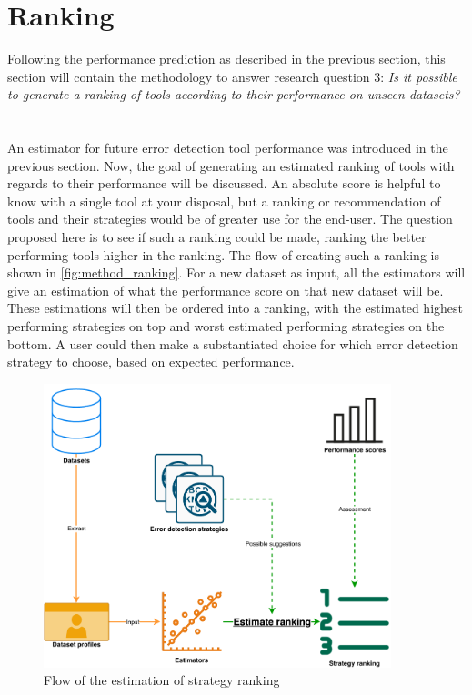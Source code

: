 \newpage
\section{Ranking}
\label{sec:toolranking}
% 
Following the performance prediction as described in the previous section, this section will contain the methodology to answer research question 3: \textit{Is it possible to generate a ranking of tools according to their performance on unseen datasets?}
~\\~\\An estimator for future error detection tool performance was introduced in the previous section. Now, the goal of generating an estimated ranking of tools with regards to their performance will be discussed. An absolute score is helpful to know with a single tool at your disposal, but a ranking or recommendation of tools and their strategies would be of greater use for the end-user. The question proposed here is to see if such a ranking could be made, ranking the better performing tools higher in the ranking. 
The flow of creating such a ranking is shown in \autoref{fig:method_ranking}. For a new dataset as input, all the estimators will give an estimation of what the performance score on that new dataset will be. These estimations will then be ordered into a ranking, with the estimated highest performing strategies on top and worst estimated performing strategies on the bottom. A user could then make a substantiated choice for which error detection strategy to choose, based on expected performance.

\begin{figure}[h]
    \centering
    \includegraphics[width=0.9\textwidth]{thesis/Figures/Method/PerformanceEstimation-Ranking.pdf}
    \caption{Flow of the estimation of strategy ranking}
    \label{fig:method_ranking}
\end{figure}

